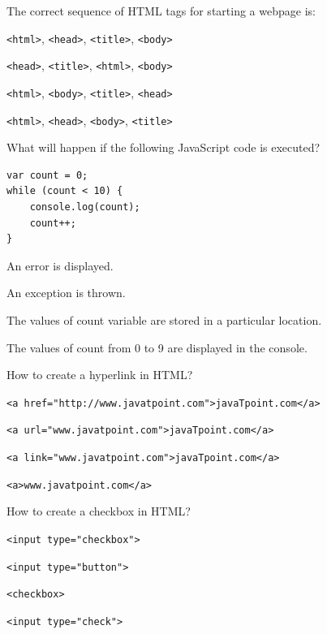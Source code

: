 \documentclass[11pt,a4paper]{article}
\begin{document}
\begin{parts}
  \item The correct sequence of HTML tags for starting a webpage is:
  
\begin{parts}
    \item   \texttt{<html>},   \texttt{<head>},   \texttt{<title>},   \texttt{<body>}
    \item   \texttt{<head>},   \texttt{<title>},   \texttt{<html>},   \texttt{<body>}
    \item   \texttt{<html>},   \texttt{<body>},   \texttt{<title>},   \texttt{<head>}
    \item   \texttt{<html>},   \texttt{<head>},   \texttt{<body>},   \texttt{<title>}
  \end{parts}

  \item What will happen if the following JavaScript code is executed?
  
\begin{lstlisting}
var count = 0;
while (count < 10) {
    console.log(count);
    count++;
}
  \end{lstlisting}
  
\begin{parts}
    \item An error is displayed.
    \item An exception is thrown.
    \item The values of count variable are stored in a particular location.
    \item The values of count from 0 to 9 are displayed in the console.
  \end{parts}

  \item How to create a hyperlink in HTML?
  
\begin{parts}
    \item   \texttt{<a href="http://www.javatpoint.com">javaTpoint.com</a>}
    \item   \texttt{<a url="www.javatpoint.com">javaTpoint.com</a>}
    \item   \texttt{<a link="www.javatpoint.com">javaTpoint.com</a>}
    \item   \texttt{<a>www.javatpoint.com</a>}
  \end{parts}

  \item How to create a checkbox in HTML?
  
\begin{parts}
    \item   \texttt{<input type="checkbox">}
    \item   \texttt{<input type="button">}
    \item   \texttt{<checkbox>}
    \item   \texttt{<input type="check">}
  \end{parts}


\end{parts}
\end{document}

